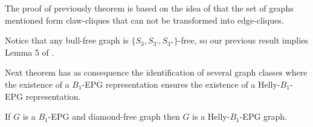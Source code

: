 
The proof of previously theorem is based on the idea of that the set of graphs mentioned form claw-cliques that can not be transformed into edge-cliques. 




Notice that any bull-free graph is $\{S_{3}, S_{3'}, S_{3''}\}$-free, so our previous result implies  Lemma 5 of  \cite{ries2009}.






Next theorem has as consequence the identification of several graph classes where the existence of a $B_1$-EPG representation ensures the existence of a Helly-$B_1$-EPG representation.


\begin{theorem} \label{lem:b1DiamondFree}
 If $G$ is a $B_1$-EPG and diamond-free graph then $G$ is a Helly-$B_1$-EPG graph.
 \end{theorem}


